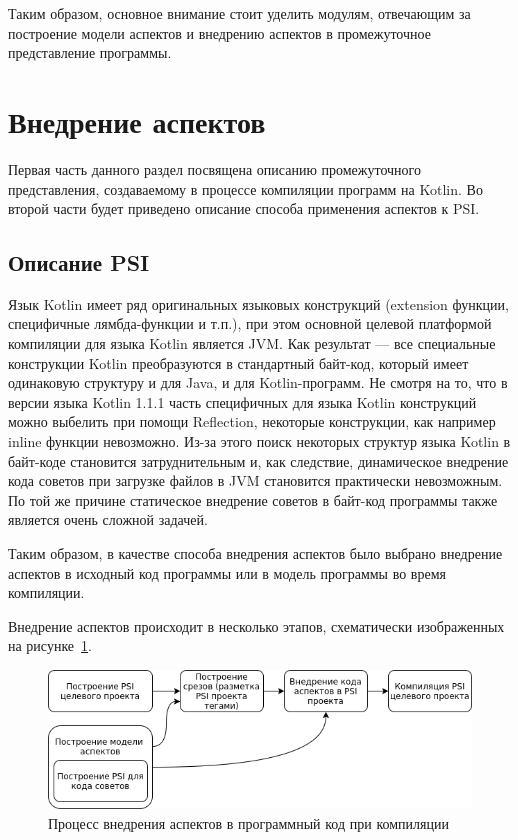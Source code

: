 Таким образом, основное внимание стоит уделить модулям, отвечающим за построение
модели аспектов и внедрению аспектов в промежуточное представление программы.
\section{Внедрение аспектов}
\label{sub:custom_aspect_weaving}
Первая часть данного раздел посвящена описанию промежуточного представления,
создаваемому в процессе компиляции программ на Kotlin.
Во второй части будет приведено описание способа применения аспектов к PSI.
\subsection{Описание PSI}
\label{sub:psi_description}
Язык Kotlin имеет ряд оригинальных языковых конструкций (extension функции,
специфичные лямбда-функции и т.п.), при этом основной целевой платформой
компиляции для языка Kotlin является JVM.
Как результат --- все специальные конструкции Kotlin преобразуются в стандартный
байт-код, который имеет одинаковую структуру и для Java, и для Kotlin-программ.
Не смотря на то, что в версии языка Kotlin 1.1.1 часть специфичных для языка
Kotlin конструкций можно выбелить при помощи Reflection, некоторые конструкции,
как например inline функции невозможно.
Из-за этого поиск некоторых структур языка Kotlin в байт-коде становится
затруднительным и, как следствие, динамическое внедрение кода советов при
загрузке файлов в JVM становится практически невозможным.
По той же причине статическое внедрение советов в байт-код программы также
является очень сложной задачей.

Таким образом, в качестве способа внедрения аспектов было выбрано внедрение аспектов в исходный код программы или в модель программы во время компиляции. 

Внедрение аспектов происходит в несколько этапов, схематически изображенных на
рисунке~\ref{fig:aspect_weaving}.
\begin{figure}[!h]
\centering
\includegraphics[width=1\textwidth]{fig/aspect_weaving}
\caption{Процесс внедрения аспектов в программный код при компиляции}
\label{fig:aspect_weaving}
\end{figure}

